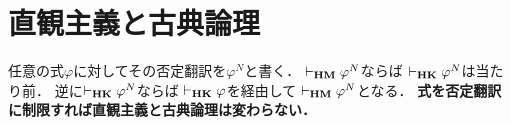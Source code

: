 \section{直観主義と古典論理}
	任意の式$\varphi$に対してその否定翻訳を$\varphi^{N}$と書く．
	$\vdash_{{\scriptsize \mbox{{\bf HM}}}} \varphi^{N}$ならば
	$\vdash_{{\scriptsize \mbox{{\bf HK}}}} \varphi^{N}$は当たり前．
	逆に$\vdash_{{\scriptsize \mbox{{\bf HK}}}} \varphi^{N}$ならば
	$\vdash_{{\scriptsize \mbox{{\bf HK}}}} \varphi$を経由して
	$\vdash_{{\scriptsize \mbox{{\bf HM}}}} \varphi^{N}$となる．
	{\bf 式を否定翻訳に制限すれば直観主義と古典論理は変わらない．}